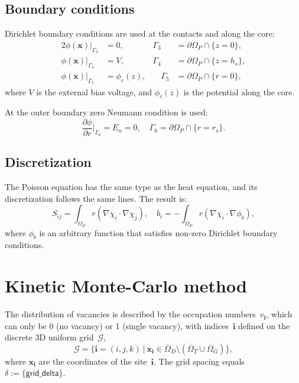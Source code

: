 \documentclass[10pt]{article}
\renewcommand{\vec}[1]{\mathbf{#1}}
\newcommand{\vi}{\vec{i}}
\newcommand{\vx}{\vec{x}}
\begin{document}
\subsection{Boundary conditions}

Dirichlet boundary conditions are used at the contacts and along the core:
\begin{alignat}{2}
	\phi(\vx)\vert_{\Gamma_3} &= 0, &
	\Gamma_3 &= \partial\Omega_P \cap \{ z = 0 \},\\
	\phi(\vx)\vert_{\Gamma_4} &= V, &
	\Gamma_4 &= \partial\Omega_P \cap \{ z = h_s \},\\
	\phi(\vx)\vert_{\Gamma_5} &= \phi_c(z), & \quad
	\Gamma_5 &= \partial\Omega_P \cap \{ r = 0 \},
\end{alignat}
where $V$ is the external bias voltage, and $\phi_c(z)$ is the potential along
the core.

At the outer boundary zero Neumann condition is used:
\begin{equation}
	\frac{\partial \phi}{\partial r} \bigg\vert_{\Gamma_6} = E_n = 0, \quad
	\Gamma_6 = \partial \Omega_P \cap \{ r = r_s \}.
\end{equation}

\subsection{Discretization}

The Poisson equation has the same type as the heat equation, and its
discretization follows the same lines. The result is:
\begin{equation}
	S_{ij} = \int_{\Omega_P} r ( \nabla\chi_i \cdot \nabla\chi_j ), \quad
	b_i = - \int_{\Omega_P} r ( \nabla\chi_i \cdot \nabla \phi_b ),
\end{equation}
where $\phi_b$ is an arbitrary function that satisfies non-zero Dirichlet
boundary conditions.

\section{Kinetic Monte-Carlo method}

The distribution of vacancies is described by the occupation numbers~$v_\vi$,
which can only be 0 (no vacancy) or 1 (single vacancy), with indices~$\vi$
defined on the discrete 3D uniform grid~$\mathcal{G}$,
\begin{equation}
	\mathcal{G} = \{ \vi = (i, j, k) \ | \ \vx_\vi \in
	\overline\Omega_D \setminus ( \overline\Omega_T \cup \overline\Omega_G ) \},
\end{equation}
where $\vx_\vi$ are the coordinates of the site~$\vi$. The grid spacing equals
$\delta := \{ \mathsf{grid\_delta} \}$.
\end{document}
